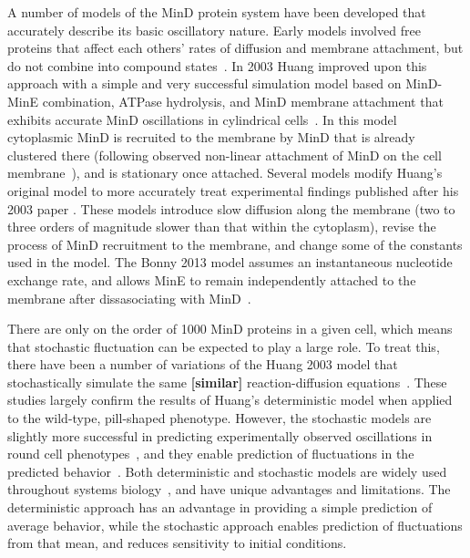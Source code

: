 \documentclass[10pt,letterpaper]{article}
\newcommand{\red}[1]{{\bf \color{red} #1}}
\newcommand{\fixme}[1]{\red{[#1]}}
\begin{document}
A number of models of the MinD protein system have been developed that
accurately describe its basic oscillatory nature.
%
Early models involved free proteins that affect each others' rates of
diffusion and membrane attachment, but do not combine into compound
states~\cite{meinhardt2001pattern}.  In 2003 Huang improved upon this
approach with a simple and very successful simulation model based on
MinD-MinE combination, ATPase hydrolysis, and MinD membrane attachment
that exhibits accurate MinD oscillations in cylindrical
cells~\cite{huang2003dynamic}. In this model cytoplasmic MinD is
recruited to the membrane by MinD that is already clustered there
(following observed non-linear attachment of MinD on the cell
membrane~\cite{hu2002dynamic,shih2002division}), and is stationary
once attached.
%
Several models
\cite{fange2006noise,bonny2013membrane,halatek2012highly} modify
Huang's original model to more accurately treat experimental findings
published after his 2003 paper
\cite{meacci2006mobility,loose2011min}. These models introduce slow
diffusion along the membrane (two to three orders of magnitude slower
than that within the cytoplasm), revise the process of MinD
recruitment to the membrane, and change some of the constants used in
the model. The Bonny 2013 model assumes an instantaneous nucleotide
exchange rate, and allows MinE to remain independently attached to the
membrane after dissasociating with MinD~\cite{bonny2013membrane}.
%



There are only on the order of 1000 MinD proteins in a given cell,
which means that stochastic fluctuation can be expected to play a
large role.  To treat this, there have been a number of variations of
the Huang 2003 model that stochastically simulate the same \fixme{similar}
reaction-diffusion equations~\cite{fange2006noise, kerr2006division}.
These studies largely confirm the results of Huang's deterministic
model when applied to the wild-type, pill-shaped phenotype.  However,
the stochastic models are slightly more successful in predicting
experimentally observed oscillations in round cell
phenotypes~\cite{fange2006noise, huang2004min}, and they enable
prediction of fluctuations in the predicted
behavior~\cite{kruse2007experimentalist}.  Both deterministic and
stochastic models are widely used throughout systems
biology~\cite{lawson2013spatial, robb2014stochastic,
  oguz2014stochastic, fu2013deterministic, rudiger2014stochastic}, and
have unique advantages and limitations.  The deterministic approach
has an advantage in providing a simple prediction of average behavior,
while the stochastic approach enables prediction of fluctuations from
that mean, and reduces sensitivity to initial conditions.
\end{document}
